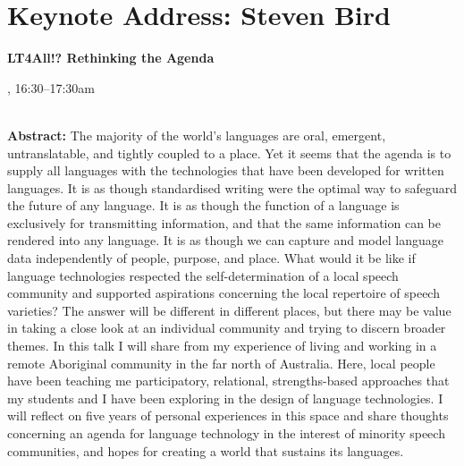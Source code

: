 \section{Keynote Address: Steven Bird}

\begin{center}
\begin{Large}
{\bfseries\Large LT4All!? Rethinking the Agenda}
\vspace{1em}\par
\end{Large}

\daydateyear, 16:30--17:30am \vspace{1em}\\
\PlenaryLoc \\
\vspace{1em}\par
\end{center}

\noindent
{\bfseries Abstract:} The majority of the world's languages are oral, emergent, untranslatable, and tightly coupled to a place. Yet it seems that the agenda is to supply all languages with the technologies that have been developed for written languages. It is as though standardised writing were the optimal way to safeguard the future of any language. It is as though the function of a language is exclusively for transmitting information, and that the same information can be rendered into any language. It is as though we can capture and model language data independently of people, purpose, and place. What would it be like if language technologies respected the self-determination of a local speech community and supported aspirations concerning the local repertoire of speech varieties? The answer will be different in different places, but there may be value in taking a close look at an individual community and trying to discern broader themes. In this talk I will share from my experience of living and working in a remote Aboriginal community in the far north of Australia. Here, local people have been teaching me participatory, relational, strengths-based approaches that my students and I have been exploring in the design of language technologies. I will reflect on five years of personal experiences in this space and share thoughts concerning an agenda for language technology in the interest of minority speech communities, and hopes for creating a world that sustains its languages.

